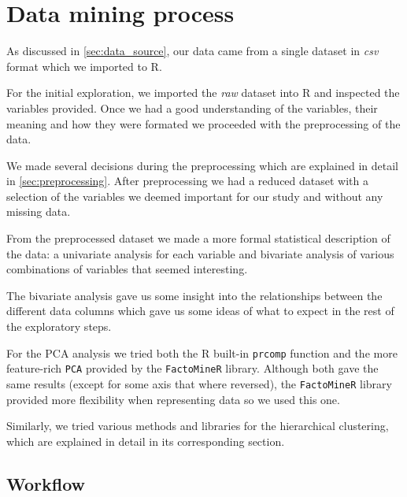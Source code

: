 

\section{Data mining process}%
\label{sec:data_mining_process}

As discussed in \cref{sec:data_source}, our data came from a single dataset
in \emph{csv} format which we imported to R.

For the initial exploration, we imported the \emph{raw} dataset into R and
inspected the variables provided. Once we had a good understanding of the
variables, their meaning and how they were formated we proceeded with the
preprocessing of the data.

We made several decisions during the preprocessing which are explained in detail
in \cref{sec:preprocessing}. After preprocessing we had a reduced dataset with
a selection of the variables we deemed important for our study and without
any missing data.

From the preprocessed dataset we made a more formal statistical description of
the data: a univariate analysis for each variable and bivariate analysis of
various combinations of variables that seemed interesting.


The bivariate analysis gave us some insight into the relationships between the
different data columns which gave us some ideas of what to expect in the rest of
the exploratory steps.

For the PCA analysis we tried both the R built-in \texttt{prcomp} function and
the more feature-rich \texttt{PCA} provided by the \texttt{FactoMineR} library.
Although both gave the same results (except for some axis that where reversed),
the \texttt{FactoMineR} library provided more flexibility when representing data
so we used this one.

Similarly, we tried various methods and libraries for the hierarchical
clustering, which are explained in detail in its corresponding section.

\subsection{Workflow}%
\label{sub:workflow}


